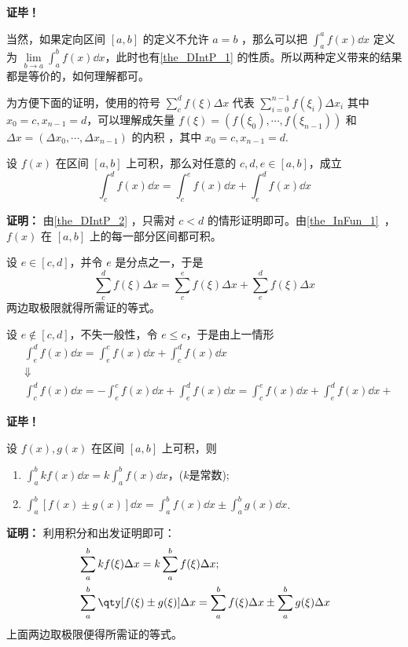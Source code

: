 \textbf{证毕！} 

当然，如果定向区间 $[a,b]$ 的定义不允许 $a=b$ ，那么可以把 $\int_a^a f(x)\dd x$ 定义为 $\lim\limits_{b\rightarrow a}\int_a^b f(x)\dd x$，此时也有\autoref{the_DIntP_1} 的性质。所以两种定义带来的结果都是等价的，如何理解都可。

为方便下面的证明，使用的符号 $\sum\limits_{c}^d f(\xi)\Delta x$ 代表 $\sum\limits_{i=0}^{n-1} f(\xi_i)\Delta x_i$ 其中 $x_0=c,x_{n-1}=d$，可以理解成矢量 $f(\xi)=(f(\xi_0),\cdots,f(\xi_{n-1}))$ 和 $\Delta x=(\Delta x_0,\cdots,\Delta x_{n-1})$ 的内积 ，其中 $x_0=c,x_{n-1}=d.$
\begin{theorem}{}
设 $f(x)$ 在区间 $[a,b]$ 上可积，那么对任意的 $c,d,e\in[a,b]$，成立
\begin{equation}
\int_c^d f(x)\dd x=\int_c^e f(x)\dd x+\int_e^d f(x)\dd x
\end{equation}
\end{theorem}
\textbf{证明：}
由\autoref{the_DIntP_2} ，只需对 $c<d$ 的情形证明即可。由\autoref{the_InFun_1}~，$f(x)$ 在 $[a,b]$ 上的每一部分区间都可积。

设 $e\in [c,d]$，并令 $e$ 是分点之一，于是
\begin{equation}
\sum_{c}^d f(\xi)\Delta x=\sum_c^e f(\xi)\Delta x+\sum_e^d f(\xi)\Delta x
\end{equation}
两边取极限就得所需证的等式。

设 $e\notin[c,d]$，不失一般性，令 $e\leq c$，于是由上一情形
\begin{equation}
\begin{aligned}
&\int_e^d f(x)\dd x=\int_e^c f(x)\dd x+\int_c^d f(x)\dd x\\
&\Downarrow\\
&\int_c^d f(x)\dd x=-\int_e^c f(x)\dd x+\int_e^d f(x)\dd x=\int_c^e f(x)\dd x+\int_e^d f(x)\dd x+
\end{aligned}
\end{equation}

\textbf{证毕！}

\begin{theorem}{}
设 $f(x),g(x)$ 在区间 $[a,b]$ 上可积，则
\begin{enumerate}
\item $\int_a^b kf(x)\dd x=k\int_a^b f(x)\dd x$，($k$是常数);
\item $\int_a^b[f(x)\pm g(x)]\dd x=\int_a^b f(x)\dd x\pm\int_a^b g(x)\dd x$.
\end{enumerate}
\end{theorem}
\textbf{证明：}
利用积分和出发证明即可：
\begin{equation}
\begin{aligned}
&\sum_{a}^bkf(\xi)\Delta x=k\sum_{a}^bf(\xi)\Delta x;\\
&\sum_a^b \qty[f(\xi)\pm g(\xi)]\Delta x=\sum_a^bf(\xi)\Delta x\pm \sum_a^bg(\xi)\Delta x
\end{aligned}
\end{equation}
上面两边取极限便得所需证的等式。

